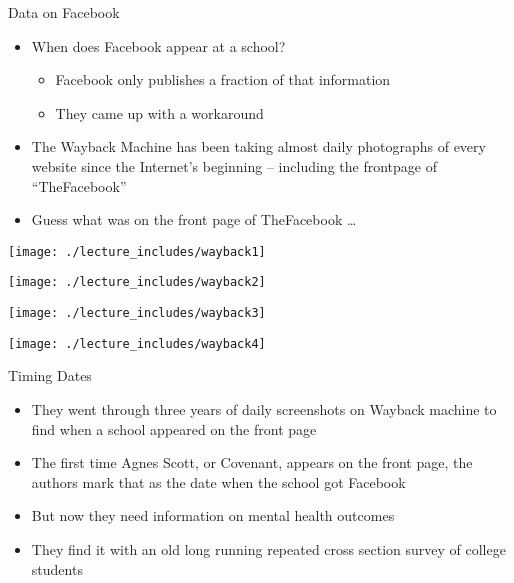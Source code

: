\documentclass{beamer}
\begin{document}
\begin{frame}{Data on Facebook}

\begin{itemize}

\item When does Facebook appear at a school?  
	\begin{itemize}
	\item Facebook only publishes a fraction of that information
	\item They came up with a workaround
	\end{itemize}
\item The Wayback Machine has been taking almost daily photographs of every website since the Internet's beginning -- including the frontpage of ``TheFacebook''
\item Guess what was on the front page of TheFacebook \dots

\end{itemize}

\end{frame}

\begin{frame}
\begin{center}
\texttt{[image: ./lecture\_includes/wayback1]}
\end{center}
\end{frame}

\begin{frame}
\begin{center}
\texttt{[image: ./lecture\_includes/wayback2]}
\end{center}
\end{frame}

\begin{frame}
\begin{center}
\texttt{[image: ./lecture\_includes/wayback3]}
\end{center}
\end{frame}

\begin{frame}
\begin{center}
\texttt{[image: ./lecture\_includes/wayback4]}
\end{center}
\end{frame}

\begin{frame}{Timing Dates}

\begin{itemize}
\item They went through three years of daily screenshots on Wayback machine to find when a school appeared on the front page
\item The first time Agnes Scott, or Covenant, appears on the front page, the authors mark that as the date when the school got Facebook
\item But now they need information on mental health outcomes
\item They find it with an old long running repeated cross section survey of college students
\end{itemize}

\end{frame}
\end{document}
